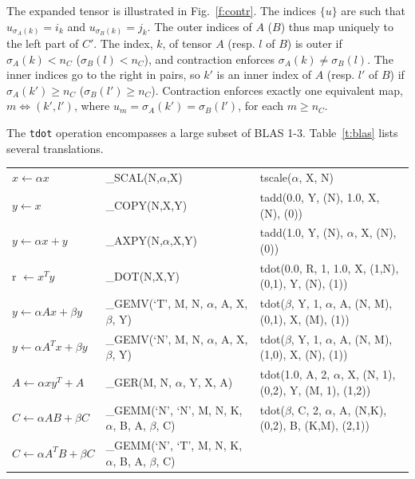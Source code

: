\documentclass{sigplanconf}
\begin{document}
  The expanded tensor is illustrated in Fig.~\ref{f:contr}.
The indices $\{u\}$ are such that $u_{\sigma_A(k)} = i_k$ and $u_{\sigma_B(k)} = j_k$.
The outer indices of $A$ ($B$) thus map uniquely to the left part of $C'$.
The index, $k$, of tensor $A$ (resp. $l$ of $B$) is outer if
$\sigma_A(k) < n_C$ ($\sigma_B(l) < n_C$), and contraction enforces $\sigma_A(k) \ne \sigma_B(l)$.
The inner indices go to the right in pairs, so $k'$ is an inner index of $A$ (resp. $l'$ of $B$)
if $\sigma_A(k') \ge n_C$ ($\sigma_B(l') \ge n_C$).
Contraction enforces exactly one equivalent map, $m \iff (k',l')$, where
$u_{m} = \sigma_A(k') = \sigma_B(l')$, for each $m \ge n_C$.

  The {\tt tdot} operation encompasses a large subset of BLAS 1-3.  Table~\ref{t:blas} lists several
translations.
\begin{table}
\begin{tabular}{lll}
$x \gets \alpha x$ & \_SCAL(N,$\alpha$,X) %
    & tscale($\alpha$, X, N) \\
$y \gets x$ & \_COPY(N,X,Y) %
    & tadd(0.0, Y, (N), 1.0, X, (N), (0)) \\
$y \gets \alpha x + y$ & \_AXPY(N,$\alpha$,X,Y) %
    & tadd(1.0, Y, (N), $\alpha$, X, (N), (0)) \\
r $\gets x^T y$ & \_DOT(N,X,Y) %
    & tdot(0.0, R, 1, 1.0, X, (1,N), (0,1), Y, (N), (1)) \\
$y \gets \alpha A x + \beta y$ & \_GEMV(`T', M, N, $\alpha$, A, X, $\beta$, Y) %
    & tdot($\beta$, Y, 1, $\alpha$, A, (N, M), (0,1), X, (M), (1)) \\
$y \gets \alpha A^T x + \beta y$ & \_GEMV(`N', M, N, $\alpha$, A, X, $\beta$, Y) %
    & tdot($\beta$, Y, 1, $\alpha$, A, (N, M), (1,0), X, (N), (1)) \\
$A \gets \alpha x y^T + A$ & \_GER(M, N, $\alpha$, Y, X, A) %
    & tdot(1.0, A, 2, $\alpha$, X, (N, 1), (0,2), Y, (M, 1), (1,2)) \\
$C \gets \alpha A B + \beta C$ & \_GEMM(`N', `N', M, N, K, $\alpha$, B, A, $\beta$, C) %
    & tdot($\beta$, C, 2, $\alpha$, A, (N,K), (0,2), B, (K,M), (2,1)) \\
$C \gets \alpha A^T B + \beta C$ & \_GEMM(`N', `T', M, N, K, $\alpha$, B, A, $\beta$, C) %

\end{tabular}
\end{table}
\end{document}
